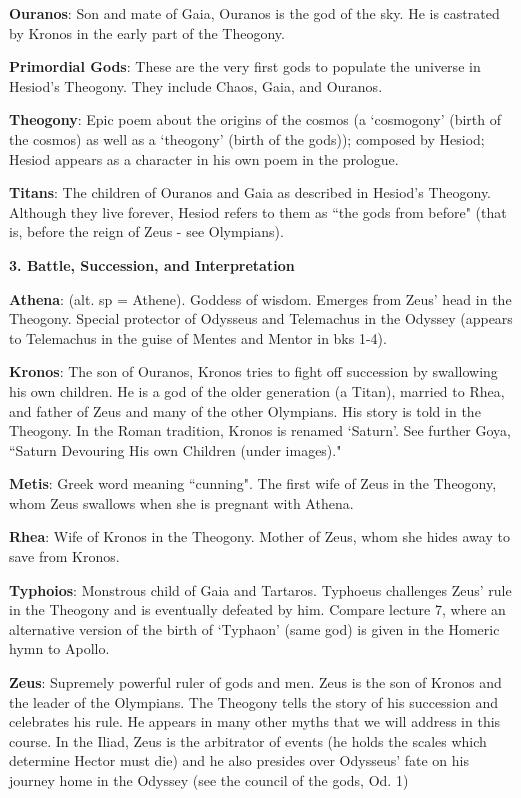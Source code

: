 \documentclass{scrartcl}
\begin{document}
\begin{multicols*}{3}
{\bf Ouranos}: Son and mate of Gaia, Ouranos is the god of the sky. He is castrated by Kronos in the early part of the Theogony.

{\bf Primordial Gods}: These are the very first gods to populate the universe in Hesiod's Theogony. They include Chaos, Gaia, and Ouranos.

{\bf Theogony}: Epic poem about the origins of the cosmos (a `cosmogony' (birth of the cosmos) as well as a `theogony' (birth of the gods)); composed by Hesiod; Hesiod appears as a character in his own poem in the prologue.

{\bf Titans}: The children of Ouranos and Gaia as described in Hesiod's Theogony. Although they live forever, Hesiod refers to them as ``the gods from before" (that is, before the reign of Zeus - see Olympians).


{\bf 3. Battle, Succession, and Interpretation}


{\bf Athena}: (alt. sp = Athene). Goddess of wisdom. Emerges from Zeus' head in the Theogony. Special protector of Odysseus and Telemachus in the Odyssey (appears to Telemachus in the guise of Mentes and Mentor in bks 1-4).

{\bf Kronos}: The son of Ouranos, Kronos tries to fight off succession by swallowing his own children. He is a god of the older generation (a Titan), married to Rhea, and father of Zeus and many of the other Olympians. His story is told in the Theogony. In the Roman tradition, Kronos is renamed `Saturn'. See further Goya, ``Saturn Devouring His own Children (under images)."

{\bf Metis}: Greek word meaning ``cunning". The first wife of Zeus in the Theogony, whom Zeus swallows when she is pregnant with Athena.

{\bf Rhea}: Wife of Kronos in the Theogony. Mother of Zeus, whom she hides away to save from Kronos.

{\bf Typhoios}: Monstrous child of Gaia and Tartaros. Typhoeus challenges Zeus' rule in the Theogony and is eventually defeated by him. Compare lecture 7, where an alternative version of the birth of `Typhaon' (same god) is given in the Homeric hymn to Apollo.

{\bf Zeus}: Supremely powerful ruler of gods and men. Zeus is the son of Kronos and the leader of the Olympians. The Theogony tells the story of his succession and celebrates his rule. He appears in many other myths that we will address in this course. In the Iliad, Zeus is the arbitrator of events (he holds the scales which determine Hector must die) and he also presides over Odysseus' fate on his journey home in the Odyssey (see the council of the gods, Od. 1)



\end{multicols*}
\end{document}
